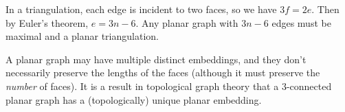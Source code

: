 
In a triangulation, each edge is incident to two faces, so we have $3f=2e$.  Then by Euler's theorem, $e=3n-6$.  Any planar graph with $3n-6$ edges must be maximal and a planar triangulation.

A planar graph may have multiple distinct embeddings, and they don't necessarily preserve the lengths of the faces (although it must preserve the \textit{number} of faces).  It is a result in topological graph theory that a $3$-connected planar graph has a (topologically) unique planar embedding.
